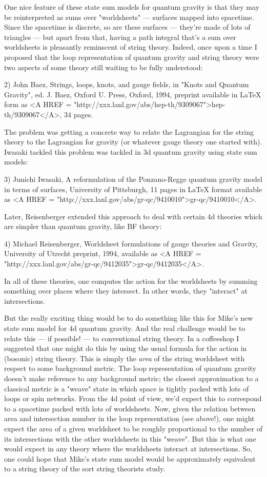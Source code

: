 One nice feature of these state sum models for quantum gravity is that
they may be reinterpreted as sums over "worldsheets" --- surfaces
mapped into spacetime.  Since the spacetime is discrete, so are these
surfaces --- they're made of lots of triangles --- but apart from
that, having a path integral that's a sum over worldsheets is
pleasantly reminscent of string theory.  Indeed, once upon a time I
proposed that the loop representation of quantum gravity and string
theory were two aspects of some theory still waiting to be fully
understood:

2) John Baez, Strings, loops, knots, and gauge fields, in "Knots and
Quantum Gravity", ed. J. Baez, Oxford U. Press, Oxford, 1994, preprint
available in LaTeX form as <A HREF = "http://xxx.lanl.gov/abs/hep-th/9309067">hep-th/9309067</A>, 34 pages.   

The problem was getting a concrete way to relate the Lagrangian for
the string theory to the Lagrangian for gravity (or whatever gauge
theory one started with).  Iwasaki tackled this problem was tackled in
3d quantum gravity using state sum models: 

3) Junichi Iwasaki, A reformulation of the Ponzano-Regge quantum
gravity model in terms of surfaces, University of Pittsburgh, 11 pages
in LaTeX format available as <A HREF = "http://xxx.lanl.gov/abs/gr-qc/9410010">gr-qc/9410010</A>.

Later, Reisenberger extended this approach to deal with certain 4d
theories which are simpler than quantum gravity, like BF theory:

4) Michael Reisenberger, Worldsheet formulations of gauge theories and
Gravity, University of Utrecht preprint, 1994, available as
<A HREF = "http://xxx.lanl.gov/abs/gr-qc/9412035">gr-qc/9412035</A>.

In all of these theories, one computes the action for the worldsheets
by summing something over places where they intersect.  In other
words, they "interact" at intersections.  

But the really exciting thing would be to do something like this for
Mike's new state sum model for 4d quantum gravity.  And the real
challenge would be to relate this --- if possible! --- to conventional
string theory.  In a coffeeshop I suggested that one might do this by
using the usual formula for the action in (bosonic) string theory.
This is simply the \emph{area} of the string worldsheet with respect to
some background metric.  The loop representation of quantum gravity
doesn't make reference to any background metric; the closest
approximation to a classical metric is a "weave" state in which space
is tightly packed with lots of loops or spin networks.  From the 4d
point of view, we'd expect this to correspond to a spacetime packed
with lots of worldsheets.  Now, given the relation between area and
intersection number in the loop representation (see above!), one might
expect the area of a given worldsheet to be roughly proportional to
the number of its intersections with the other worldsheets in this
"weave".  But this is what one would expect in any theory where the
worldsheets interact at intersections.  So, one could hope that Mike's
state sum model would be approximately equivalent to a string theory
of the sort string theorists study.

